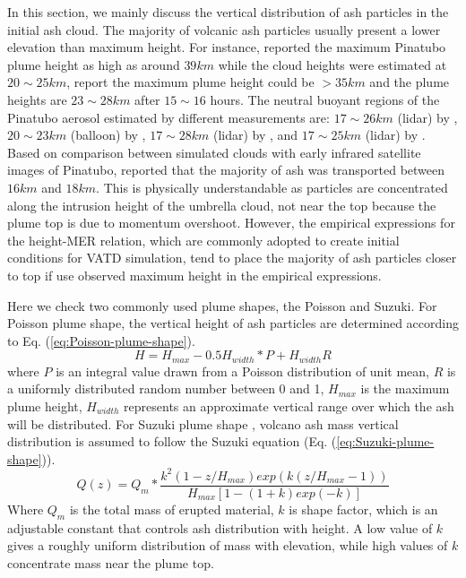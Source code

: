 \documentclass[utf8]{frontiersSCNS} %
\begin{document}
In this section, we mainly discuss the vertical distribution of ash particles in the initial ash cloud.
The majority of volcanic ash particles usually present a lower elevation than maximum height. For instance, \citet{holasek1996satellite, holasek1996experiments} reported the maximum Pinatubo plume height as high as around $39 km$ while the cloud heights were estimated at $20 \sim 25 km $, \citet{self1993atmospheric} report the maximum plume height could be $>35 km$ and the plume heights are $23 \sim 28 km$ after $15 \sim 16$ hours. The neutral buoyant regions of the Pinatubo aerosol estimated by different measurements are: $17 \sim 26 km$ (lidar) by \citet{defoor1992early}, $20 \sim 23 km$ (balloon) by \citet{deshler1992balloonborne}, $17 \sim 28 km$ (lidar) by \citet{jager1992pinatubo}, and $17 \sim 25 km$ (lidar) by \citet{avdyushin19931}. Based on comparison between simulated clouds with early infrared satellite images of Pinatubo, \citet{fero2008simulation} reported that the majority of ash was transported between $16 km$ and $18 km$. This is physically understandable as particles are concentrated along the intrusion height of the umbrella cloud, not near the top because the plume top is due to momentum overshoot. However, the empirical expressions for the height-MER relation, which are commonly adopted to create initial conditions for VATD simulation, tend to place the majority of ash particles closer to top if use observed maximum height in the empirical expressions.

Here we check two commonly used plume shapes, the Poisson and Suzuki.
For Poisson plume shape, the vertical height of ash particles are determined according to Eq. (\ref{eq:Poisson-plume-shape}).
\begin{equation}
H=H_{max} - 0.5 H_{width}*P+H_{width}R
\label{eq:Poisson-plume-shape}
\end{equation}
where $P$ is an integral value drawn from a Poisson distribution of unit mean, $R$ is a uniformly distributed random number between 0 and 1, $H_{max}$ is the maximum plume height, $H_{width}$ represents an approximate vertical range over which the ash will be distributed.
For Suzuki plume shape \citep{suzuki1983theoretical}, volcano ash mass vertical distribution is assumed to follow the Suzuki equation (Eq. (\ref{eq:Suzuki-plume-shape})).
\begin{equation}
Q(z)=Q_m* \frac{k^2(1-z/H_{max})exp\left(k(z/H_{max} -1 )\right)}{H_{max}\left[1-(1+k)exp(-k)\right]}
\label{eq:Suzuki-plume-shape}
\end{equation}
Where $Q_m$ is the total mass of erupted material, $k$ is shape factor, which is an adjustable constant that controls ash distribution with height. A low value of $k$ gives a roughly uniform distribution of mass with elevation, while high values of $k$ concentrate mass near the plume top.
\end{document}
